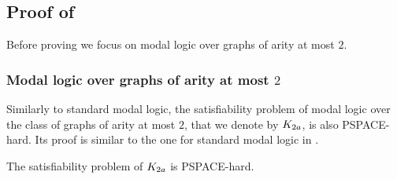 \subsection{Proof of }

Before proving  we focus on modal logic over graphs of arity at most $2$.


\subsubsection{Modal logic over graphs of arity at most $2$}

Similarly to standard modal logic, the satisfiability problem of modal logic over the class of graphs of arity at most $2$, that we denote by $K_{2a}$, is also PSPACE-hard. Its proof is similar to the one for standard modal logic in \citet{DBLP:books/cu/BlackburnRV01}.


\begin{lemma}
	\label{lemma:K2a}
    The satisfiability problem of $K_{2a}$ is PSPACE-hard.
\end{lemma}


